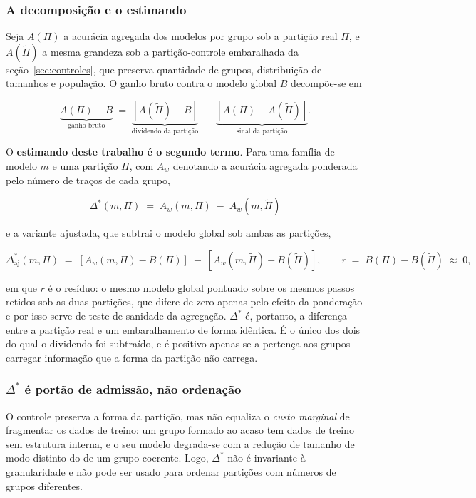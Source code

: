 \subsubsection*{A decomposição e o estimando}

Seja $A(\Pi)$ a acurácia agregada dos modelos por grupo sob a partição real $\Pi$, e
$A(\tilde{\Pi})$ a mesma grandeza sob a partição-controle embaralhada da seção~\ref{sec:controles},
que preserva quantidade de grupos, distribuição de tamanhos e população. O ganho bruto contra o
modelo global $B$ decompõe-se em

\[
\underbrace{A(\Pi) - B}_{\text{ganho bruto}} \;=\;
\underbrace{\left[A(\tilde{\Pi}) - B\right]}_{\text{dividendo da partição}} \;+\;
\underbrace{\left[A(\Pi) - A(\tilde{\Pi})\right]}_{\text{sinal da partição}} .
\]

O \textbf{estimando deste trabalho é o segundo termo}. Para uma família de modelo $m$ e uma partição
$\Pi$, com $A_w$ denotando a acurácia agregada ponderada pelo número de traços de cada grupo,

\[
\boxed{\;\Delta^{*}(m,\Pi) \;=\; A_w\!\left(m,\Pi\right) \;-\; A_w\!\left(m,\tilde{\Pi}\right)\;}
\]

\noindent e a variante ajustada, que subtrai o modelo global sob ambas as partições,

\[
\Delta^{*}_{\mathrm{aj}}(m,\Pi) \;=\;
\left[A_w(m,\Pi) - B(\Pi)\right] \;-\; \left[A_w(m,\tilde{\Pi}) - B(\tilde{\Pi})\right],
\qquad
r \;=\; B(\Pi) - B(\tilde{\Pi}) \;\approx\; 0 ,
\]

\noindent em que $r$ é o resíduo: o mesmo modelo global pontuado sobre os mesmos passos retidos sob
as duas partições, que difere de zero apenas pelo efeito da ponderação e por isso serve de teste de
sanidade da agregação. $\Delta^{*}$ é, portanto, a diferença entre a partição real e um
embaralhamento de forma idêntica. É o único dos dois do qual o dividendo foi
subtraído, e é positivo apenas se a pertença aos grupos carregar informação que a forma da partição
não carrega.

\subsubsection*{$\Delta^{*}$ é portão de admissão, não ordenação}

O controle preserva a forma da partição, mas não equaliza o \emph{custo
marginal} de fragmentar os dados de treino: um grupo formado ao acaso tem dados de treino sem
estrutura interna, e o seu modelo degrada-se com a redução de tamanho de modo distinto do de um
grupo coerente. Logo, $\Delta^{*}$ não é invariante à granularidade e não pode ser usado para
ordenar partições com números de grupos diferentes.

